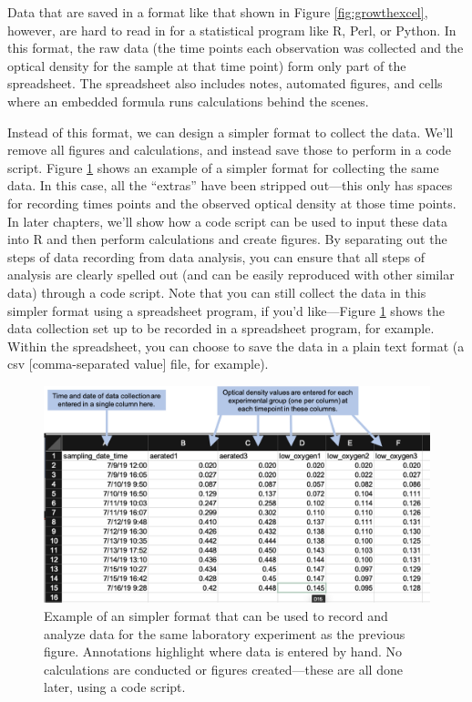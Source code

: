 \documentclass[]{tufte-book}
\begin{document}
Data that are saved in a format like that shown in Figure \ref{fig:growthexcel},
however, are hard to read in for a statistical program like R, Perl, or Python.
In this format, the raw data (the time points each observation was collected and
the optical density for the sample at that time point) form only part of the
spreadsheet. The spreadsheet also includes notes, automated figures, and
cells where an embedded formula runs calculations behind the scenes.

Instead of this format, we can design a simpler format to collect the data. We'll
remove all figures and calculations, and instead save those to perform in a
code script. Figure \ref{fig:growthsimple} shows an example of a simpler
format for collecting the same data. In this case, all the ``extras'' have been
stripped out---this only has spaces for recording times points and the observed
optical density at those time points. In later chapters, we'll show how a code
script can be used to input these data into R and then perform calculations
and create figures. By separating out the steps of data recording from
data analysis, you can ensure that all steps of analysis are clearly spelled
out (and can be easily reproduced with other similar data) through a code
script. Note that you can still collect the data in this simpler format using
a spreadsheet program, if you'd like---Figure \ref{fig:growthsimple} shows
the data collection set up to be recorded in a spreadsheet program, for example.
Within the spreadsheet, you can choose to save the data in a plain text format
(a csv {[}comma-separated value{]} file, for example).

\begin{figure}
\includegraphics[width=\textwidth]{figures/growth_curve_simple} \caption[Example of an simpler format that can be used to record and analyze data for the same laboratory experiment as the previous figure]{Example of an simpler format that can be used to record and analyze data for the same laboratory experiment as the previous figure. Annotations highlight where data is entered by hand. No calculations are conducted or figures created---these are all done later, using a code script.}\label{fig:growthsimple}
\end{figure}
\end{document}
